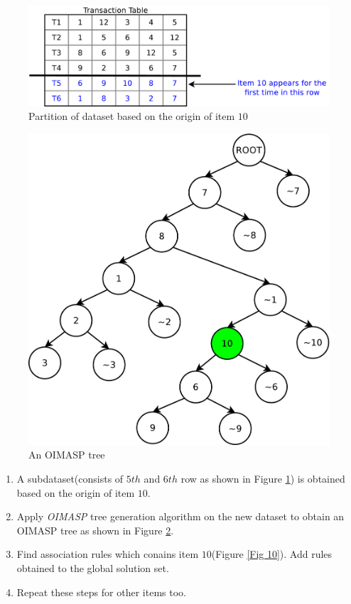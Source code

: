 \documentclass[review]{elsarticle}
\begin{document}
\begin{figure}
\begin{center}
\includegraphics[scale=0.35]{pdf/partition}
\end{center}
\caption{Partition of dataset based on the origin of item $ 10 $}
\label{Fig 8}
\end{figure}

\begin{figure}
\begin{center}
\includegraphics[scale=0.35]{pdf/moimasp}
\end{center}
\caption{An OIMASP tree}
\label{Fig 9}
\end{figure}

\begin{enumerate}[Step 1.]
\item A subdataset(consists of $ 5th $ and $ 6th $ row as shown in Figure \ref{Fig 8}) is obtained based on the origin of item $ 10 $.
\item Apply \emph{OIMASP} tree generation algorithm on the new dataset to obtain an OIMASP tree as shown in Figure \ref{Fig 9}.
\item Find association rules which conains item $ 10 $(Figure \ref{Fig 10}). Add rules obtained to the global solution set.
\item Repeat these steps for other items too.
\end{enumerate}
\end{document}
